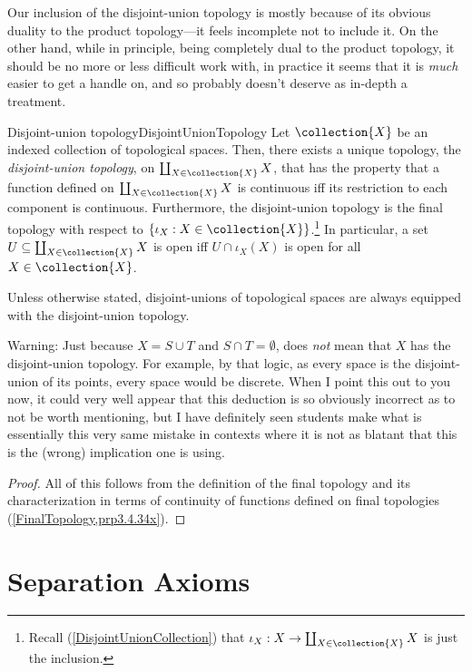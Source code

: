 Our inclusion of the disjoint-union topology is mostly because of its obvious duality to the product topology---it feels incomplete not to include it.  On the other hand, while in principle, being completely dual to the product topology, it should be no more or less difficult work with, in practice it seems that it is \emph{much} easier to get a handle on, and so probably doesn't deserve as in-depth a treatment.
\begin{prp}{Disjoint-union topology}{DisjointUnionTopology}
Let $\collection{X}$ be an indexed collection of topological spaces.  Then, there exists a unique topology, the \emph{disjoint-union topology}, on $\coprod _{X\in \collection{X}}X$, that has the property that a function defined on $\coprod _{X\in \collection{X}}X$ is continuous iff its restriction to each component is continuous.  Furthermore, the disjoint-union topology is the final topology with respect to $\{ \iota _X:X\in \collection{X}\}$.\footnote{Recall (\cref{DisjointUnionCollection}) that $\iota _X:X\rightarrow \coprod _{X\in \collection{X}}X$ is just the inclusion.}  In particular, a set $U\subseteq \coprod _{X\in \collection{X}}X$ is open iff $U\cap \iota _X(X)$ is open for all $X\in \collection{X}$.
\begin{rmk}
Unless otherwise stated, disjoint-unions of topological spaces are always equipped with the disjoint-union topology.
\end{rmk}
\begin{wrn}
Warning:  Just because $X=S\cup T$ and $S\cap T=\emptyset$, does \emph{not} mean that $X$ has the disjoint-union topology.  For example, by that logic, as every space is the disjoint-union of its points, every space would be discrete.  When I point this out to you now, it could very well appear that this deduction is so obviously incorrect as to not be worth mentioning, but I have definitely seen students make what is essentially this very same mistake in contexts where it is not as blatant that this is the (wrong) implication one is using.
\end{wrn}
\begin{proof}
All of this follows from the definition of the final topology and its characterization in terms of continuity of functions defined on final topologies (\cref{FinalTopology,prp3.4.34x}).
\end{proof}
\end{prp}

\section{Separation Axioms}\label{sct4.5}

